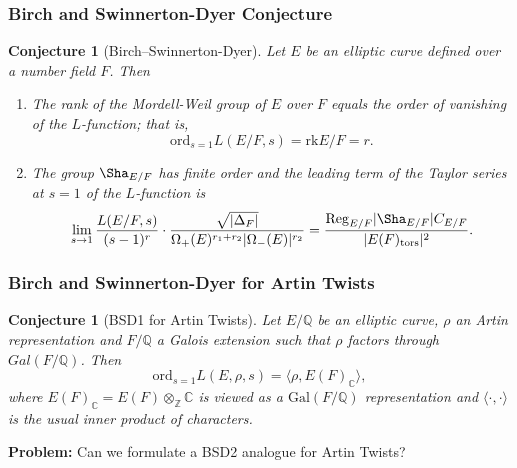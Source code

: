 \documentclass{beamer}
\newcommand{\Gal}{\mathrm{Gal}}
\newcommand{\BSD}{\mathrm{BSD}}
\newcommand{\tors}{\mathrm{tors}}
\newcommand{\Reg}{\mathrm{Reg}}
\newcommand{\rk}{\mathrm{rk}}
\newcommand{\ord}{\mathrm{ord}}
\newcommand{\CC}{\mathbb{C}}
\newcommand{\QQ}{\mathbb{Q}}
\newcommand{\ZZ}{\mathbb{Z}}
\theoremstyle{plain}
\newtheorem{conjecture}[thm]{Conjecture}
\begin{document}
\begin{frame}
    \frametitle{Birch and Swinnerton-Dyer Conjecture}
    \begin{conjecture}[Birch--Swinnerton-Dyer]
        Let $E$ be an elliptic curve defined over a number field $F$. Then 
        \begin{enumerate}%
            \item The rank of the Mordell-Weil group of $E$ over $F$ equals the order of vanishing of the $L$-function; that is,
            $$\ord_{s=1}L(E/F,s)=\rk E/F = r.$$ \pause
            \item The group $\Sha_{E / F}$ has finite order and the leading term of the Taylor series at $s=1$ of the $L$-function is
            \begin{equation*}\label{BSD_2}
                \lim_{s\to1}\frac{L(E/F,s)}{(s-1)^r}\cdot\frac{\sqrt{|\Delta_F|}}{\Omega_+(E)^{r_1+r_2}|\Omega_-(E)|^{r_2}}=\frac{\Reg_{E/F}|\Sha_{E/F}|C_{E/F}}{|E(F)_{\tors}|^2}.
            \end{equation*}
        \end{enumerate}
    \end{conjecture}
    

\end{frame}

\iffalse
\begin{frame}
    \frametitle{Birch and Swinnerton-Dyer for Artin Twists}
    \begin{conjecture}[BSD1 for Artin Twists]
        Let $E/\QQ$ be an elliptic curve, $\rho$ an Artin representation and $F/\QQ$ a Galois extension such that $\rho$ factors through $Gal(F/\QQ)$. Then
        $$\ord_{s=1}L(E,\rho,s)=\langle\rho,E(F)_\CC\rangle,$$
        where $E(F)_\CC=E(F)\otimes_\ZZ \CC$ is viewed as a $\Gal(F/\QQ)$ representation and $\langle\cdot,\cdot\rangle$ is the usual inner product of characters.
    \end{conjecture} \pause
    \textbf{Problem:} Can we formulate a BSD2 analogue for Artin Twists?
\end{frame}
\end{document}
